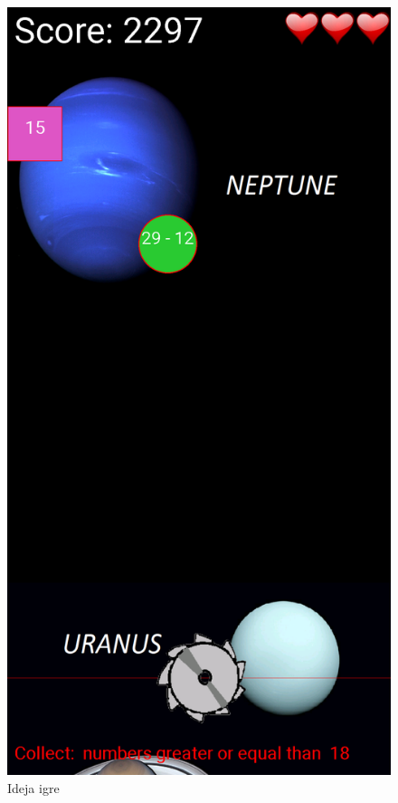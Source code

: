 \documentclass[times, utf8, zavrsni, numeric]{fer}
\begin{document}
		\begin{figure}[H]
			\includegraphics[scale = 0.225]{"slike/igra.png"} 
			\centering
			\caption{Ideja igre}
			\label{fig:idejaigre}
		\end{figure}
		
\end{document}
